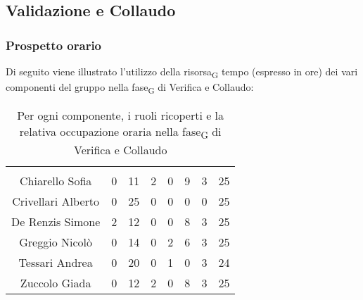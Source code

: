 \subsection{Validazione e Collaudo}

\subsubsection{Prospetto orario}
Di seguito viene illustrato l'utilizzo della \gls{risorsa}\textsubscript{G} tempo (espresso in ore) dei vari componenti del gruppo nella \gls{fase}\textsubscript{G} di Verifica e Collaudo:

\begin{table}[H]
	\begin{center}
		\begin{tabular}{c
				!{\color[HTML]{9b240a}\vrule width 1pt}
				cccccc
				!{\color[HTML]{9b240a}\vrule width 1pt}	
				c}
			\rowcolorhead
			 &  &  &  &  &  &  &  \\
			
			Chiarello Sofia & 0 & 11 & 2 & 0 & 9 & 3 & 25\\
			Crivellari Alberto & 0 & 25 & 0 & 0 & 0 & 0 & 25\\
			De Renzis Simone & 2 & 12 & 0 & 0 & 8 & 3 & 25\\
			Greggio Nicolò & 0 & 14 & 0 & 2 & 6 & 3 & 25\\
			Tessari Andrea & 0 & 20 & 0 & 1 & 0 & 3 & 24\\
			Zuccolo Giada & 0 & 12 & 2 & 0 & 8 & 3 & 25\\
		\end{tabular}
		\caption[Occupazione oraria Verifica e Collaudo]{Per ogni componente, i ruoli ricoperti e la relativa occupazione oraria nella \gls{fase}\textsubscript{G} di Verifica e Collaudo}
	\end{center}
\end{table}


